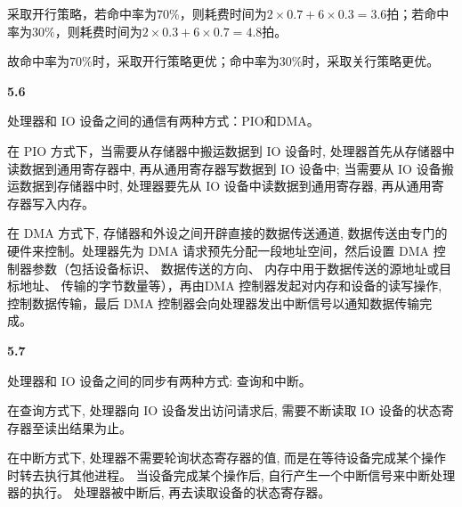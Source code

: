 \documentclass[UTF8]{report}
\begin{document}
采取开行策略，若命中率为$70\%$，则耗费时间为$2 \times 0.7 + 6 \times 0.3 = 3.6$拍；若命中率为$30\%$，则耗费时间为$2 \times 0.3 + 6 \times 0.7 = 4.8$拍。

故命中率为$70\%$时，采取开行策略更优；命中率为$30\%$时，采取关行策略更优。

\noindent
\textbf{5.6}

处理器和 IO 设备之间的通信有两种方式：PIO和DMA。

在 PIO 方式下，当需要从存储器中搬运数据到 IO 设备时, 处理器首先从存储器中读数据到通用寄存器中, 再从通用寄存器写数据到 IO 设备中; 当需要从 IO 设备搬运数据到存储器中时, 处理器要先从 IO 设备中读数据到通用寄存器, 再从通用寄存器写入内存。

在 DMA 方式下, 存储器和外设之间开辟直接的数据传送通道, 数据传送由专门的硬件来控制。处理器先为 DMA 请求预先分配一段地址空间，然后设置 DMA 控制器参数（包括设备标识、 数据传送的方向、 内存中用于数据传送的源地址或目标地址、 传输的字节数量等），再由DMA 控制器发起对内存和设备的读写操作, 控制数据传输，最后 DMA 控制器会向处理器发出中断信号以通知数据传输完成。

\noindent
\textbf{5.7}

处理器和 IO 设备之间的同步有两种方式: 查询和中断。

在查询方式下, 处理器向 IO 设备发出访问请求后, 需要不断读取 IO 设备的状态寄存器至读出结果为止。

在中断方式下, 处理器不需要轮询状态寄存器的值, 而是在等待设备完成某个操作时转去执行其他进程。 当设备完成某个操作后, 自行产生一个中断信号来中断处理器的执行。 处理器被中断后, 再去读取设备的状态寄存器。 
\end{document}

